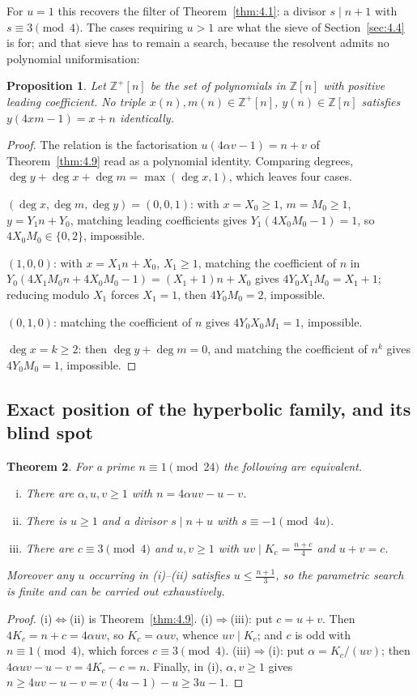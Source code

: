 \documentclass[11pt, a4paper]{article}
\theoremstyle{plain}
\newtheorem{theorem}{Theorem}[section]
\newtheorem{proposition}[theorem]{Proposition}
\theoremstyle{definition}
\newcommand{\Z}{\mathbb{Z}}
\begin{document}
For $u=1$ this recovers the filter of Theorem~\ref{thm:4.1}: a divisor $s\mid n+1$ with $s \equiv 3 \pmod{4}$. The cases requiring $u > 1$ are what the sieve of Section~\ref{sec:4.4} is for; and that sieve has to remain a search, because the resolvent admits no polynomial uniformisation:

\begin{proposition} \label{prop:poly_obstruction}
Let $\Z^{+}[n]$ be the set of polynomials in $\Z[n]$ with positive leading coefficient. No triple $x(n), m(n) \in \Z^{+}[n]$, $y(n) \in \Z[n]$ satisfies $y(4xm-1) = x+n$ identically.
\end{proposition}
\begin{proof}
The relation is the factorisation $u(4\alpha v-1)=n+v$ of Theorem~\ref{thm:4.9} read as a polynomial identity. Comparing degrees, $\deg y+\deg x+\deg m=\max(\deg x,1)$, which leaves four cases.

$(\deg x,\deg m,\deg y)=(0,0,1)$: with $x=X_0\ge1$, $m=M_0\ge1$, $y=Y_1n+Y_0$, matching leading coefficients gives $Y_1(4X_0M_0-1)=1$, so $4X_0M_0\in\{0,2\}$, impossible.

$(1,0,0)$: with $x=X_1n+X_0$, $X_1\ge1$, matching the coefficient of $n$ in $Y_0(4X_1M_0n+4X_0M_0-1)=(X_1+1)n+X_0$ gives $4Y_0X_1M_0=X_1+1$; reducing modulo $X_1$ forces $X_1=1$, then $4Y_0M_0=2$, impossible.

$(0,1,0)$: matching the coefficient of $n$ gives $4Y_0X_0M_1=1$, impossible.

$\deg x=k\ge2$: then $\deg y+\deg m=0$, and matching the coefficient of $n^{k}$ gives $4Y_0M_0=1$, impossible.
\end{proof}

\subsection{Exact position of the hyperbolic family, and its blind spot} \label{sec:4.3bis}

\begin{theorem}\label{thm:hyper_char}
For a prime $n\equiv1\pmod{24}$ the following are equivalent.
\begin{enumerate}[(i)]
    \item There are $\alpha,u,v\ge1$ with $n=4\alpha uv-u-v$.
    \item There is $u\ge1$ and a divisor $s\mid n+u$ with $s\equiv-1\pmod{4u}$.
    \item There are $c\equiv3\pmod4$ and $u,v\ge1$ with $uv\mid K_c=\frac{n+c}{4}$ and $u+v=c$.
\end{enumerate}
Moreover any $u$ occurring in (i)--(ii) satisfies $u\le\frac{n+1}{3}$, so the parametric search is finite and can be carried out exhaustively.
\end{theorem}
\begin{proof}
(i)$\Leftrightarrow$(ii) is Theorem~\ref{thm:4.9}. (i)$\Rightarrow$(iii): put $c=u+v$. Then $4K_c=n+c=4\alpha uv$, so $K_c=\alpha uv$, whence $uv\mid K_c$; and $c$ is odd with $n\equiv1\pmod4$, which forces $c\equiv3\pmod4$. (iii)$\Rightarrow$(i): put $\alpha=K_c/(uv)$; then $4\alpha uv-u-v=4K_c-c=n$. Finally, in (i), $\alpha,v\ge1$ gives $n\ge 4uv-u-v=v(4u-1)-u\ge 3u-1$.
\end{proof}
\end{document}
